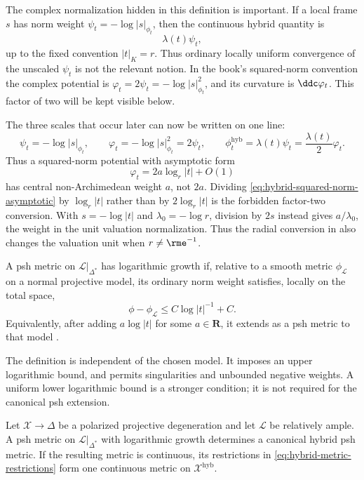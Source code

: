 The complex normalization hidden in this definition is important.
If a local frame $s$ has norm weight
$\psi_t=-\log|s|_{\phi_t}$, then the continuous hybrid quantity is
\[
                         \lambda(t)\psi_t,
\tag{66.17}\label{eq:hybrid-weight-normalization}
\]
up to the fixed convention $|t|_K=r$. Thus ordinary locally uniform
convergence of the unscaled $\psi_t$ is not the relevant notion.  In the
book's squared-norm convention the complex potential is
$\varphi_t=2\psi_t=-\log|s|_{\phi_t}^{2}$, and its curvature is
$\ddc\varphi_t$.  This factor of two will be kept visible below.

The three scales that occur later can now be written on one line:
\[
 \psi_t=-\log|s|_{\phi_t},
 \qquad
 \varphi_t=-\log|s|_{\phi_t}^{2}=2\psi_t,
 \qquad
 \phi_t^{\mathrm{hyb}}=\lambda(t)\psi_t
       =\frac{\lambda(t)}2\varphi_t.
\tag{66.18}\label{eq:hybrid-three-weight-scales}
\]
Thus a squared-norm potential with asymptotic form
\[
             \varphi_t=2a\log_r|t|+O(1)
\tag{66.19}\label{eq:hybrid-squared-norm-asymptotic}
\]
has central non-Archimedean weight $a$, not $2a$.  Dividing
\eqref{eq:hybrid-squared-norm-asymptotic} by $\log_r|t|$ rather than by
$2\log_r|t|$ is the forbidden factor-two conversion.  With $s=-\log|t|$ and $\lambda_0=-\log r$, division by $2s$ instead gives
$a/\lambda_0$, the weight in the unit valuation normalization. Thus the
radial conversion in  also changes the
valuation unit when $r\ne\rme^{-1}$.

\begin{definition}
\label{def:hybrid-log-growth}
A psh metric on $\mathcal L|_{\Delta^*}$ has logarithmic growth if, relative to a smooth metric $\phi_{\mathcal L}$ on a normal projective model, its ordinary norm weight satisfies, locally on the total space,
\[
 \phi-\phi_{\mathcal L}\leq C\log|t|^{-1}+C.
\tag{66.20}\label{eq:hybrid-log-growth}
\]
Equivalently, after adding $a\log|t|$ for some $a\in\mathbf R$, it extends as a psh metric to that model \cite[Definition~3.9]{PS23Hybrid}.
\end{definition}

The definition is independent of the chosen model. It imposes an upper
logarithmic bound, and permits singularities and unbounded negative
weights. A uniform lower logarithmic bound is a stronger condition; it is
not required for the canonical psh extension.

\begin{theorem}\label{thm:hybrid-psh-extension}
Let $\mathcal X\to\Delta$ be a polarized projective degeneration and let $\mathcal L$ be relatively ample. A psh metric on $\mathcal L|_{\Delta^*}$ with logarithmic growth determines a canonical hybrid psh metric. If the resulting metric is continuous, its restrictions in \eqref{eq:hybrid-metric-restrictions} form one continuous metric on $\mathcal X^{\mathrm{hyb}}$.
\end{theorem}

